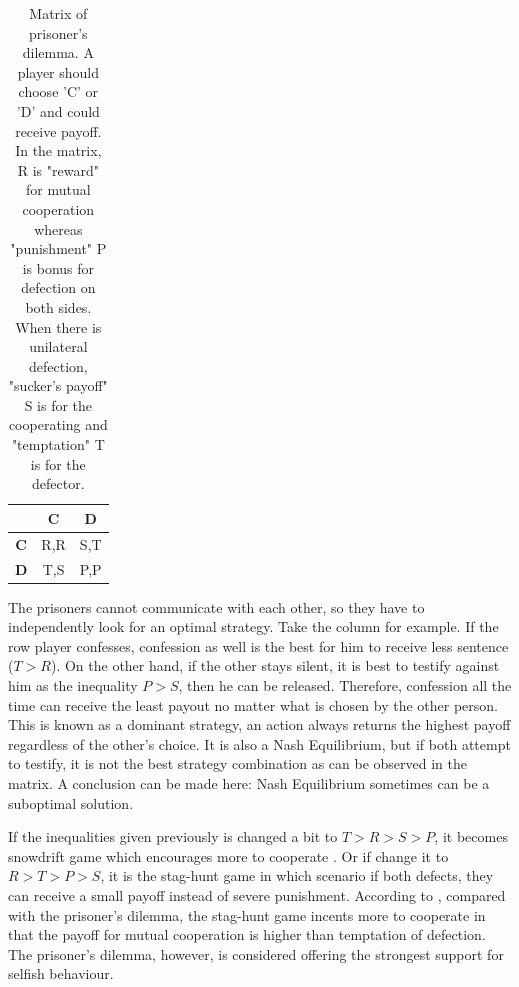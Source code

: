 \begin{table}[!htb]
  \centering
  \begin{tabular}{ c | c | c }
  \toprule
  \textbf{} & \textbf{C} & \textbf{D}\\
  \midrule
  \textbf{C} & R,R & S,T\\
  \midrule
  \textbf{D} & T,S & P,P\\
  \bottomrule
  \end{tabular}
  \caption{Matrix of prisoner's dilemma. A player should choose 'C' or 'D' and could receive payoff. In the matrix, R is "reward" for mutual cooperation \citep{helbing2009outbreak} whereas "punishment" P is bonus for defection on both sides. When there is unilateral defection, "sucker's payoff" S is for the cooperating and "temptation" T is for the defector. }
  \label{Table:pdmatrix}
\end{table}

The prisoners cannot communicate with each other, so they have to independently look for an optimal strategy. Take the column for example. If the row player confesses, confession as well is the best for him to receive less sentence ($T > R$). On the other hand, if the other stays silent, it is best to testify against him as the inequality $P > S$, then he can be released. Therefore, confession all the time can receive the least payout no matter what is chosen by the other person. This is known as a dominant strategy, an action always returns the highest payoff regardless of the other's choice. It is also a Nash Equilibrium, but if both attempt to testify, it is not the best strategy combination as can be observed in the matrix. A conclusion can be made here: Nash Equilibrium sometimes can be a suboptimal solution.

If the inequalities given previously is changed a bit to $T > R > S > P$, it becomes snowdrift game which encourages more to cooperate \citep{hauert2004spatial}. Or if change it to $R > T > P > S$, it is the stag-hunt game in which scenario if both defects, they can receive a small payoff instead of severe punishment. According to \citet{perc2010coevolutionary}, compared with the prisoner's dilemma, the stag-hunt game incents more to cooperate in that the payoff for mutual cooperation is higher than temptation of defection. The prisoner's dilemma, however, is considered offering the strongest support for selfish behaviour.

